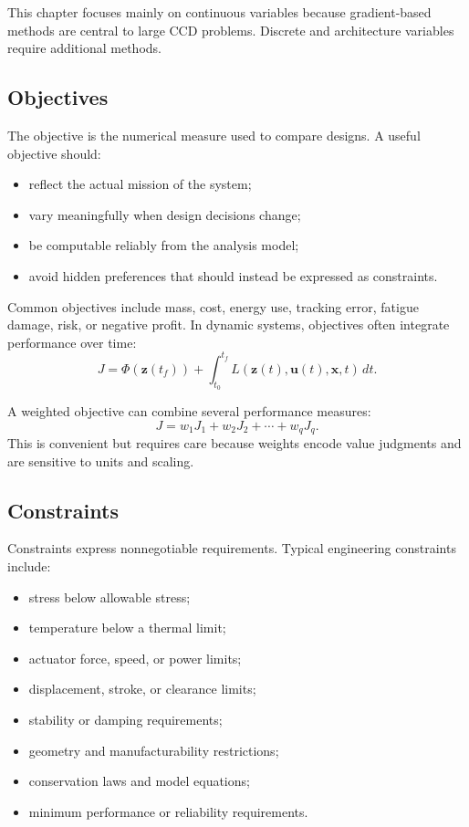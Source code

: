 \documentclass[11pt]{article}
\newcommand{\vect}[1]{\boldsymbol{#1}}
\newcommand{\des}{\vect{x}}
\newcommand{\statev}{\vect{z}}
\newcommand{\ctrlu}{\vect{u}}
\begin{document}
This chapter focuses mainly on continuous variables because gradient-based methods are central to large CCD problems. Discrete and architecture variables require additional methods.

\subsection{Objectives}

The objective is the numerical measure used to compare designs. A useful objective should:
\begin{itemize}[leftmargin=1.4em]
  \item reflect the actual mission of the system;
  \item vary meaningfully when design decisions change;
  \item be computable reliably from the analysis model;
  \item avoid hidden preferences that should instead be expressed as constraints.
\end{itemize}

Common objectives include mass, cost, energy use, tracking error, fatigue damage, risk, or negative profit. In dynamic systems, objectives often integrate performance over time:
\begin{equation}
J = \Phi(\statev(t_f)) + \int_{t_0}^{t_f} L(\statev(t),\ctrlu(t),\des,t)\,dt.
\end{equation}

A weighted objective can combine several performance measures:
\begin{equation}
J = w_1 J_1 + w_2 J_2 + \cdots + w_q J_q.
\end{equation}
This is convenient but requires care because weights encode value judgments and are sensitive to units and scaling.

\subsection{Constraints}

Constraints express nonnegotiable requirements. Typical engineering constraints include:
\begin{itemize}[leftmargin=1.4em]
  \item stress below allowable stress;
  \item temperature below a thermal limit;
  \item actuator force, speed, or power limits;
  \item displacement, stroke, or clearance limits;
  \item stability or damping requirements;
  \item geometry and manufacturability restrictions;
  \item conservation laws and model equations;
  \item minimum performance or reliability requirements.
\end{itemize}
\end{document}
